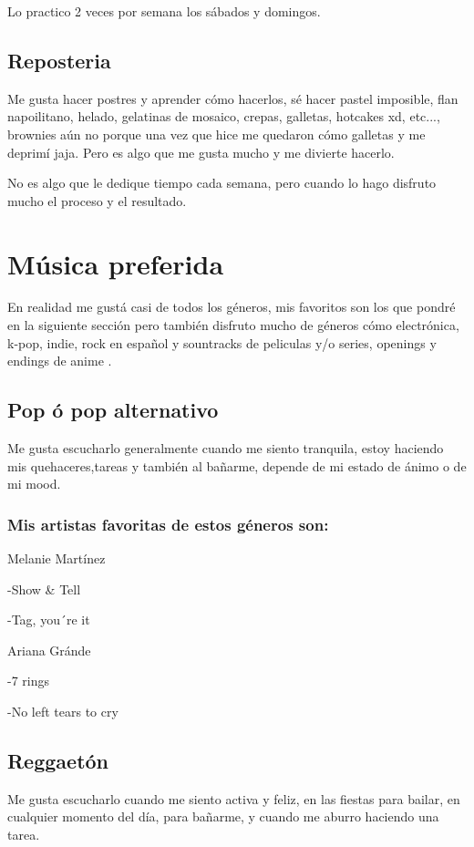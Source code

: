 \documentclass[12pt]{article}
\begin{document}
Lo practico 2 veces por semana los sábados y domingos.


\subsection{Reposteria}
Me gusta hacer postres y aprender cómo hacerlos, sé hacer pastel imposible, flan napoilitano, helado, gelatinas de mosaico, crepas, galletas, hotcakes xd, etc..., brownies aún no porque una vez que hice me quedaron cómo galletas y me deprimí jaja. Pero es algo que me gusta mucho y me divierte hacerlo. 



No es algo que le dedique tiempo cada semana, pero cuando lo hago disfruto mucho el proceso y el resultado.

\section{Música preferida}
En realidad me gustá casi de todos los géneros, mis favoritos son los que pondré en la siguiente sección pero también disfruto mucho de géneros cómo electrónica, k-pop, indie, rock en español y sountracks de peliculas y\slash o series, openings y endings de anime
. 
\subsection{Pop ó pop alternativo}
Me gusta escucharlo generalmente cuando me siento tranquila, estoy haciendo mis quehaceres,tareas y también al bañarme, depende de mi estado de ánimo o de mi mood.



\subsubsection{Mis artistas favoritas de estos géneros son:}
Melanie Martínez

-Show \& Tell

-Tag, you´re it

Ariana Gránde 

-7 rings

-No left tears to cry

\subsection{Reggaetón}
Me gusta escucharlo cuando me siento activa y feliz, en las fiestas para bailar, en cualquier momento del día, para bañarme, y cuando me aburro haciendo una tarea. 
\end{document}
